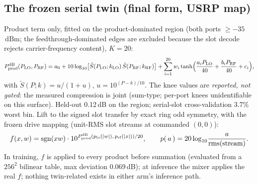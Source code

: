 \documentclass[11pt]{article}
\newcommand{\dbm}{\ensuremath{\,\mathrm{dBm}}}
\begin{document}
\subsection*{The frozen serial twin (final form, USRP map)}
Product term only, fitted on the product-dominated region (both
ports $\ge -35$\dbm; the feedthrough-dominated edges are excluded
because the slot decode rejects carrier-frequency content), $K=20$:
\begin{equation}
P^{\rm dB}_{\rm prod}(P_{\rm LO},P_{\rm RF}) = a_0 +
10\log_{10}\!\big[\tilde S(P_{\rm LO};k_{\rm LO})\,
\tilde S(P_{\rm RF};k_{\rm RF})\big]
+ \sum_{i=1}^{20} w_i \tanh\!\Big(\frac{a_iP_{\rm LO}}{40} +
\frac{b_iP_{\rm RF}}{40} + c_i\Big),
\end{equation}
with $\tilde S(P;k) = u/(1+u)$, $u = 10^{(P-k)/10}$. The knee values
are \emph{reported, not gated}: the measured compression is joint
(sum-type; per-port knees unidentifiable on this surface). Held-out
0.12\,dB on the region; serial-slot cross-validation 3.7\% worst bin.
Lift to the signed slot transfer by exact ring odd symmetry, with the
frozen drive mapping (unit-RMS slot streams at commanded $(0,0)$):
\begin{equation}
f(x,w) = \operatorname{sgn}(xw)\cdot
10^{P^{\rm dB}_{\rm prod}(p_{\rm lo}(|w|),\,p_{\rm rf}(|x|))/20},
\qquad p(\,a\,) = 20\log_{10}\!\frac{a}{\mathrm{rms}(\text{stream})}.
\end{equation}
In training, $f$ is applied to every product before summation
(evaluated from a $256^2$ bilinear table, max deviation 0.069\,dB);
at inference the mixer applies the real $f$; nothing twin-related
exists in either arm's inference path.
\end{document}
